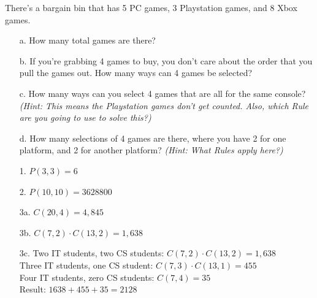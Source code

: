 {\begin{questionNOGRADE}{\thequestion}
    \end{questionNOGRADE}

    \hrulefill

    \begin{questionNOGRADE}{\thequestion}
        There's a bargain bin that has 5 PC games, 3 Playstation games, and 8 Xbox games.

        \begin{enumerate}
            \item[a.]   How many total games are there?
            
            \item[b.]   If you're grabbing 4 games to buy, you don't care about the order
                        that you pull the games out. How many ways can 4 games be selected?

            \item[c.]   How many ways can you select 4 games that are all for the same console?
                        \textit{(Hint: This means the Playstation games don't get counted.
                        Also, which Rule are you going to use to solve this?)}

            \item[d.]   How many selections of 4 games are there, where you have 2 for one platform,
                        and 2 for another platform?
                        \textit{(Hint: What Rules apply here?)}
        \end{enumerate}
    \end{questionNOGRADE}
    
}{
    \begin{itemize}
        \item[1.]   $P(3,3) = 6$
        
        \item[2.]   $P(10, 10) = 3628800$
        
        \item[3a.]  $C(20,4) = 4,845$
        \item[3b.]  $C(7,2) \cdot C(13,2) = 1,638$
        \item[3c.]  Two IT students, two CS students: $C(7,2) \cdot C(13,2) = 1,638$ \\
                    Three IT students, one CS student: $C(7,3) \cdot C(13,1) = 455$ \\
                    Four IT students, zero CS students: $C(7, 4) = 35$ \\
                    Result: $ 1638 + 455 + 35 = 2128 $


\end{itemize}}
